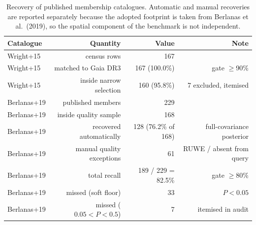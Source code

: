 \begin{table}
\caption{Recovery of published membership catalogues. Automatic and manual recoveries are reported separately because the adopted footprint is taken from Berlanas et al.\ (2019), so the spatial component of the benchmark is not independent.}
\label{tab:literature}
\centering
\begin{tabular}{lrrr}
\hline\hline
Catalogue & Quantity & Value & Note \\
\hline
Wright+15 & census rows & 167 &  \\
Wright+15 & matched to Gaia DR3 & 167 (100.0\%) & gate $\geq$90\% \\
Wright+15 & inside narrow selection & 160 (95.8\%) & 7 excluded, itemised \\
Berlanas+19 & published members & 229 &  \\
Berlanas+19 & inside quality sample & 168 &  \\
Berlanas+19 & recovered automatically & 128 (76.2\% of 168) & full-covariance posterior \\
Berlanas+19 & manual quality exceptions & 61 & RUWE / absent from query \\
Berlanas+19 & total recall & 189 / 229 = 82.5\% & gate $\geq$80\% \\
Berlanas+19 & missed (soft floor) & 33 & $P<0.05$ \\
Berlanas+19 & missed ($0.05<P<0.5$) & 7 & itemised in audit \\
\hline
\end{tabular}
\end{table}
